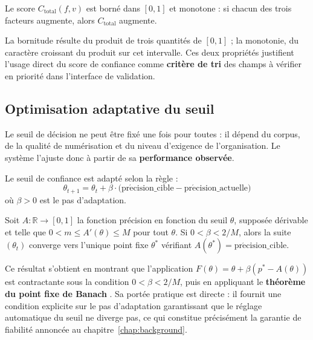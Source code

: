\begin{theoreme}
\label{th:coherence-confiance}
Le score $C_{\text{total}}(f, v)$ est borné dans $[0, 1]$ et monotone : si chacun des trois
facteurs augmente, alors $C_{\text{total}}$ augmente.
\end{theoreme}

La bornitude résulte du produit de trois quantités de $[0,1]$ ; la monotonie, du caractère
croissant du produit sur cet intervalle. Ces deux propriétés justifient l'usage direct du
score de confiance comme \textbf{critère de tri} des champs à vérifier en priorité dans
l'interface de validation.

\subsection{Optimisation adaptative du seuil}
\label{subsec:seuil-adaptatif}

Le seuil de décision ne peut être fixé une fois pour toutes : il dépend du corpus, de la
qualité de numérisation et du niveau d'exigence de l'organisation. Le système l'ajuste donc à
partir de sa \textbf{performance observée}.

\begin{definition}
\label{def:maj-seuil}
Le seuil de confiance est adapté selon la règle :
\begin{equation}
\theta_{t+1} = \theta_t + \beta\cdot\big(\mathrm{pr\acute{e}cision\_cible} - \mathrm{pr\acute{e}cision\_actuelle}\big)
\end{equation}
où $\beta > 0$ est le pas d'adaptation.
\end{definition}

\begin{theoreme}
\label{th:convergence}
Soit $A : \mathbb{R} \rightarrow [0,1]$ la fonction précision en fonction du seuil $\theta$,
supposée dérivable et telle que $0 < m \leq A'(\theta) \leq M$ pour tout $\theta$. Si
$0 < \beta < 2/M$, alors la suite $(\theta_t)$ converge vers l'unique point fixe
$\theta^\ast$ vérifiant $A(\theta^\ast) = \mathrm{pr\acute{e}cision\_cible}$.
\end{theoreme}

Ce résultat s'obtient en montrant que l'application $F(\theta) = \theta + \beta(p^\ast -
A(\theta))$ est contractante sous la condition $0 < \beta < 2/M$, puis en appliquant le
\textbf{théorème du point fixe de Banach} \cite{granas2003fixedpoint}. Sa portée pratique est
directe : il fournit une condition explicite sur le pas d'adaptation garantissant que le
réglage automatique du seuil ne diverge pas, ce qui constitue précisément la garantie de
fiabilité annoncée au chapitre~\ref{chap:background}.

